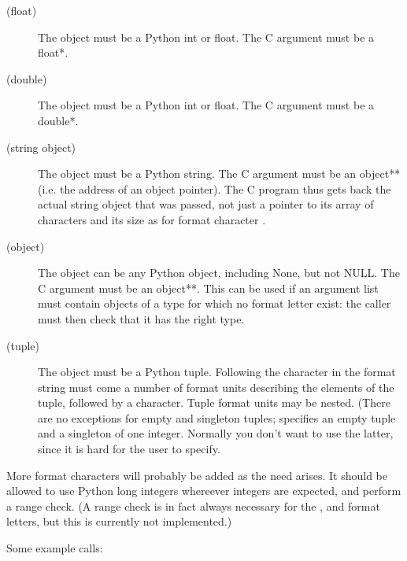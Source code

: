 \begin{description}
\item[ (float)]
The object must be a Python int or float.  The C argument must be a
float*.

\item[ (double)]
The object must be a Python int or float.  The C argument must be a
double*.

\item[ (string object)]
The object must be a Python string.  The C argument must be an
object** (i.e. the address of an object pointer).  The C program thus
gets back the actual string object that was passed, not just a pointer
to its array of characters and its size as for format character
.

\item[ (object)]
The object can be any Python object, including None, but not NULL.
The C argument must be an object**.  This can be used if an argument
list must contain objects of a type for which no format letter exist:
the caller must then check that it has the right type.

\item[\samp{(} (tuple)]
The object must be a Python tuple.  Following the \samp{(} character
in the format string must come a number of format units describing the
elements of the tuple, followed by a \samp{)} character.  Tuple
format units may be nested.  (There are no exceptions for empty and
singleton tuples; \samp{()} specifies an empty tuple and  a
singleton of one integer.  Normally you don't want to use the latter,
since it is hard for the user to specify.

\end{description}

More format characters will probably be added as the need arises.  It
should be allowed to use Python long integers whereever integers are
expected, and perform a range check.  (A range check is in fact always
necessary for the ,  and  format
letters, but this is currently not implemented.)

Some example calls:

